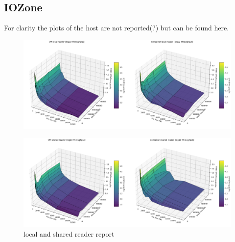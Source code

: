\subsection{IOZone}

For clarity the plots of the host are not reported(?) but can be found here.
\begin{figure}[H]
    \centering
    \includegraphics[width=\linewidth]{assets/VM local reader_Container local reader_log_surfaces.png}
    \end{figure}
\begin{figure}[H]
    \centering
    \includegraphics[width=\linewidth]{assets/VM shared reader_Container shared reader_log_surfaces.png}
    \caption{local and shared reader report}
    \label{fig:enter-label}
\end{figure}

